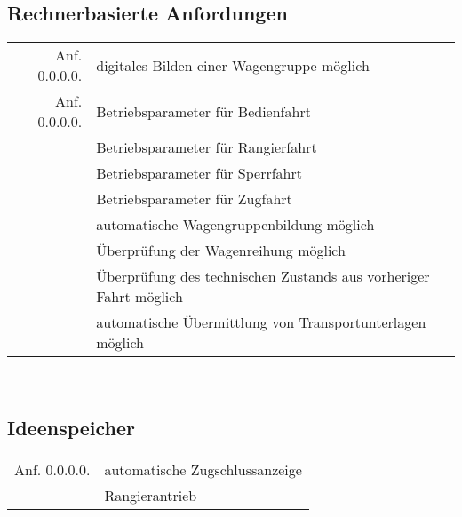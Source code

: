 \subsection{Rechnerbasierte Anfordungen}
\begin{tabular}{r|l}
	\hline
	Anf. 0.0.0.0.	&	digitales Bilden einer Wagengruppe möglich	\\
	Anf. 0.0.0.0.	&	Betriebsparameter für Bedienfahrt			\\
					&	Betriebsparameter für Rangierfahrt			\\
					&	Betriebsparameter für Sperrfahrt			\\
					&	Betriebsparameter für Zugfahrt				\\
					&	automatische Wagengruppenbildung möglich	\\
					&	Überprüfung der Wagenreihung möglich		\\
					&	Überprüfung des technischen Zustands aus vorheriger Fahrt möglich\\
					&	automatische Übermittlung von Transportunterlagen möglich\\
	\hline
\end{tabular}\\
\subsection{Ideenspeicher}
\begin{tabular}{r|l}
	\hline
	Anf. 0.0.0.0.	&	automatische Zugschlussanzeige				\\
					&	Rangierantrieb								\\
	\hline
\end{tabular}